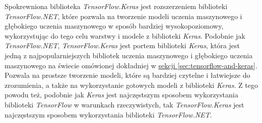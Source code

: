 Spokrewniona biblioteka \emph{TensorFlow.Keras} jest rozszerzeniem biblioteki \emph{TensorFlow.NET}, które pozwala na tworzenie modeli uczenia maszynowego i głębokiego uczenia maszynowego w sposób bardziej wysokopoziomowy, wykorzystując do tego celu warstwy i modele z biblioteki \emph{Keras}.
Podobnie jak \emph{TensorFlow.NET}, \emph{TensorFlow.Keras} jest portem biblioteki \emph{Keras}, która jest jedną z najpopularniejszych bibliotek uczenia maszynowego i głębokiego uczenia maszynowego na świecie omówionej dokładniej w \hyperref[sec:tensorflow-and-keras]{sekcji \ref*{sec:tensorflow-and-keras}}.
Pozwala na prostsze tworzenie modeli, które są bardziej czytelne i łatwiejsze do zrozumienia, a także na wykorzystanie gotowych modeli z biblioteki \emph{Keras}.
Z tego powodu też, podobnie jak \emph{Keras} jest najczęstszym sposobem wykorzystania biblioteki \emph{TensorFlow} w warunkach rzeczywistych, tak \emph{TensorFlow.Keras} jest najczęstszym sposobem wykorzystania biblioteki \emph{TensorFlow.NET}.
